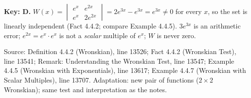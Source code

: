 \documentclass[11pt,a4paper]{article}
\newcommand{\Src}[1]{{\footnotesize\color{black!65}Source: #1}}
\begin{document}
\textbf{Key: D.} $W(x)=\begin{vmatrix}e^{x}&e^{2x}\\e^{x}&2e^{2x}\end{vmatrix}=2e^{3x}-e^{3x}=e^{3x}\neq0$ for every $x$, so the set is linearly independent (Fact 4.4.2; compare Example 4.4.5). $3e^{3x}$ is an arithmetic error; $e^{2x}=e^{x}\cdot e^{x}$ is not a \emph{scalar} multiple of $e^{x}$; $W$ is never zero.\par
\Src{Definition 4.4.2 (Wronskian), line 13526; Fact 4.4.2 (Wronskian Test), line 13541; Remark: Understanding the Wronskian Test, line 13547; Example 4.4.5 (Wronskian with Exponentials), line 13617; Example 4.4.7 (Wronskian with Scalar Multiples), line 13707. Adaptation: new pair of functions ($2\times2$ Wronskian); same test and interpretation as the notes.}\par
\end{document}
